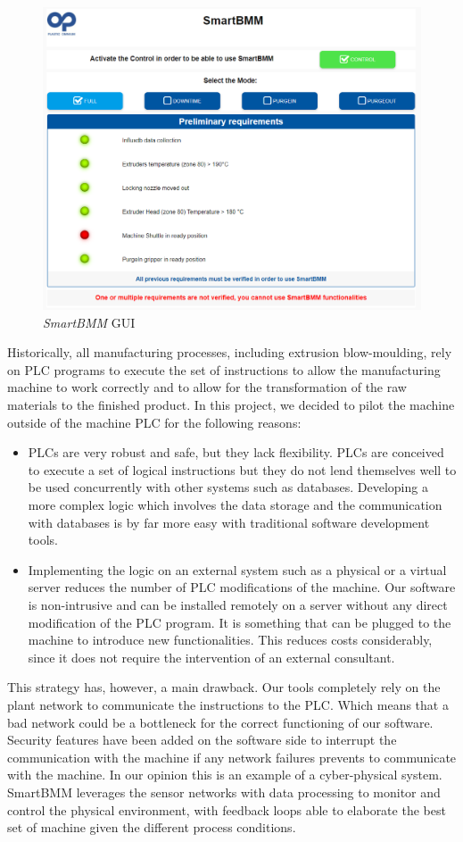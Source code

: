 %
\begin{figure}
\centerline{\includegraphics[scale=0.5]{images/chapter_3/SmartBMM_gui.png}}
\caption{\textit{SmartBMM} GUI}
\label{fig:SmartBMM_gui}
\end{figure}
%
Historically, all manufacturing processes, including extrusion  blow-moulding, rely on PLC programs to execute the set of instructions to allow the manufacturing machine to work correctly and to allow for the transformation of the raw materials to the finished product. In this project, we decided to pilot the machine outside of the machine PLC for the following reasons:
%
\begin{itemize}
    \item PLCs are very robust and safe, but they lack flexibility. PLCs are conceived to execute a set of logical instructions but they do not lend themselves well to be used concurrently with other systems such as databases. Developing a more complex logic which involves the data storage and the communication with databases is by far more easy with traditional software development tools.
    \item Implementing the logic on an external system such as a physical or a virtual server reduces the number of PLC modifications of the machine. Our software is  non-intrusive and can be installed remotely on a server without any direct modification of the PLC program. It is something that can be plugged to the machine to introduce new functionalities. This reduces costs considerably, since it does not require the intervention of an external consultant.
\end{itemize}
%
This strategy has, however, a main drawback. Our tools completely rely on the plant network to communicate the instructions to the PLC. Which means that a bad network could be a bottleneck for the correct functioning of our software. Security features have been added on the software side to interrupt the communication with the machine if any network failures prevents to communicate with the machine.
In our opinion this is an example of a cyber-physical system. SmartBMM leverages the sensor networks with data processing to monitor and control the physical environment, with feedback loops able to elaborate the best set of machine given the different process conditions.


